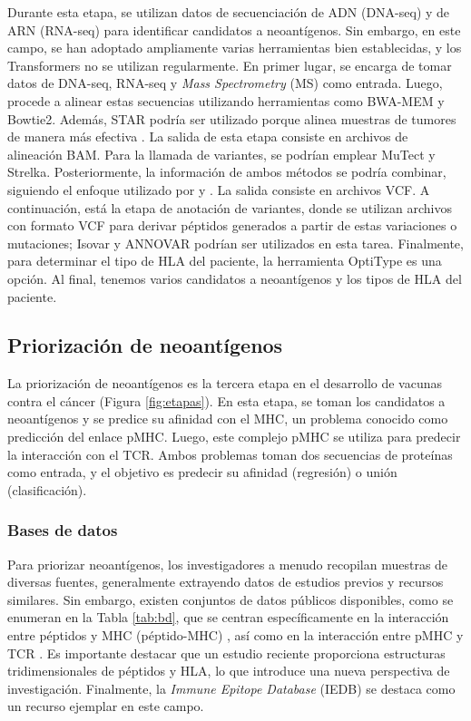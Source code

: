 Durante esta etapa, se utilizan datos de secuenciación de ADN (DNA-seq) y de ARN (RNA-seq) para identificar candidatos a neoantígenos. Sin embargo, en este campo, se han adoptado ampliamente varias herramientas bien establecidas, y los Transformers no se utilizan regularmente. En primer lugar, se encarga de tomar datos de DNA-seq, RNA-seq y \textit{Mass Spectrometry} (MS) como entrada. Luego, procede a alinear estas secuencias utilizando herramientas como BWA-MEM y Bowtie2. Además, STAR podría ser utilizado porque alinea muestras de tumores de manera más efectiva \citep{rubinsteyn2018computational}. La salida de esta etapa consiste en archivos de alineación BAM. Para la llamada de variantes, se podrían emplear MuTect y Strelka. Posteriormente, la información de ambos métodos se podría combinar, siguiendo el enfoque utilizado por \cite{zhou2021prioritizing} y \cite{rubinsteyn2018computational}. La salida consiste en archivos VCF. A continuación, está la etapa de anotación de variantes, donde se utilizan archivos con formato VCF para derivar péptidos generados a partir de estas variaciones o mutaciones; Isovar y ANNOVAR podrían ser utilizados en esta tarea. Finalmente, para determinar el tipo de HLA del paciente, la herramienta OptiType es una opción. Al final, tenemos varios candidatos a neoantígenos y los tipos de HLA del paciente.

\subsection{Priorización de neoantígenos}

La priorización de neoantígenos es la tercera etapa en el desarrollo de vacunas contra el cáncer (Figura \ref{fig:etapas}). En esta etapa, se toman los candidatos a neoantígenos y se predice su afinidad con el MHC, un problema conocido como predicción del enlace pMHC. Luego, este complejo pMHC se utiliza para predecir la interacción con el TCR. Ambos problemas toman dos secuencias de proteínas como entrada, y el objetivo es predecir su afinidad (regresión) o unión (clasificación). 


\subsubsection{Bases de datos}

Para priorizar neoantígenos, los investigadores a menudo recopilan muestras de diversas fuentes, generalmente extrayendo datos de estudios previos y recursos similares. Sin embargo, existen conjuntos de datos públicos disponibles, como se enumeran en la Tabla \ref{tab:bd}, que se centran específicamente en la interacción entre péptidos y MHC (péptido-MHC)  \citep{wu2018tsnadb, zhou2019neopeptide, tan2020dbpepneo, lu2022dbpepneo2}, así como en la interacción entre pMHC y TCR \citep{shugay2018vdjdb, bagaev2020vdjdb}. Es importante destacar que un estudio reciente proporciona estructuras tridimensionales de péptidos y HLA, lo que introduce una nueva perspectiva de investigación. Finalmente, la \textit{Immune Epitope Database} (IEDB) \citep{vita2019immune} se destaca como un recurso ejemplar en este campo.

